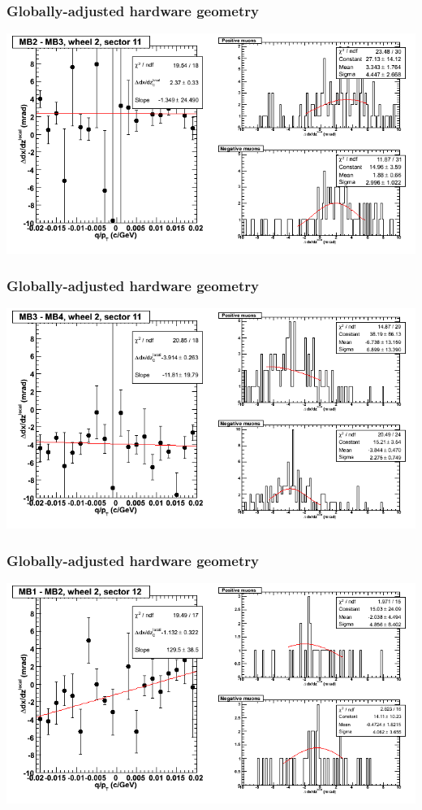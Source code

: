 \documentclass[compress]{beamer}
\begin{document}
\begin{frame}
\frametitle{Globally-adjusted hardware geometry}
\includegraphics[width=\linewidth]{NOV4_segdiffs_HW/dt13_slope_E_11_23.png}
\end{frame}

\begin{frame}
\frametitle{Globally-adjusted hardware geometry}
\includegraphics[width=\linewidth]{NOV4_segdiffs_HW/dt13_slope_E_11_34.png}
\end{frame}

\begin{frame}
\frametitle{Globally-adjusted hardware geometry}
\includegraphics[width=\linewidth]{NOV4_segdiffs_HW/dt13_slope_E_12_12.png}
\end{frame}
\end{document}
